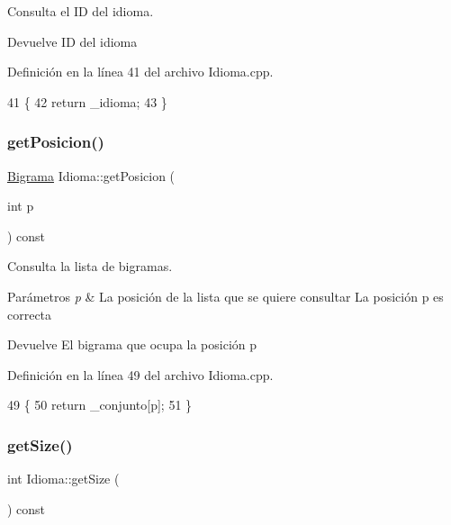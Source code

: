 Consulta el ID del idioma. 

\begin{DoxyReturn}{Devuelve}
ID del idioma 
\end{DoxyReturn}


Definición en la línea 41 del archivo Idioma.\+cpp.


\begin{DoxyCode}
41                                   \{
42     \textcolor{keywordflow}{return} \_idioma;
43 \}
\end{DoxyCode}
\mbox{\label{classIdioma_ae20fa510506967e26191fcb930fc210e}} 
\subsubsection{\texorpdfstring{get\+Posicion()}{getPosicion()}}
{\footnotesize\ttfamily \hyperlink{classBigrama}{Bigrama} Idioma\+::get\+Posicion (\begin{DoxyParamCaption}\item[{int}]{p }\end{DoxyParamCaption}) const}



Consulta la lista de bigramas. 


\begin{DoxyParams}{Parámetros}
{\em p} & La posición de la lista que se quiere consultar  La posición {\ttfamily p} es correcta \\
\hline
\end{DoxyParams}
\begin{DoxyReturn}{Devuelve}
El bigrama que ocupa la posición {\ttfamily p} 
\end{DoxyReturn}


Definición en la línea 49 del archivo Idioma.\+cpp.


\begin{DoxyCode}
49                                        \{
50     \textcolor{keywordflow}{return} \_conjunto[p];
51 \}
\end{DoxyCode}
\mbox{\label{classIdioma_a32dc7a4370ad2b5dff89ce331acac878}} 
\subsubsection{\texorpdfstring{get\+Size()}{getSize()}}
{\footnotesize\ttfamily int Idioma\+::get\+Size (\begin{DoxyParamCaption}{ }\end{DoxyParamCaption}) const\hspace{0.3cm}{\ttfamily [inline]}}



